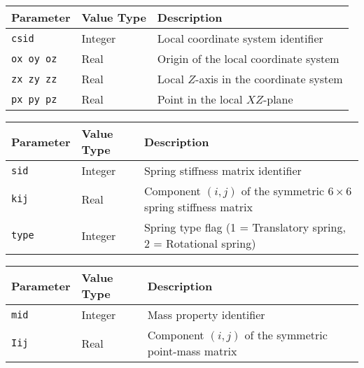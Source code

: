 
\noindent
\begin{tabular}{| m{} | m{} | m{} |}
  \hline
  \rowcolor[HTML]{EFEFEF}
  Parameter  & Value Type & Description \\
  \hline\hline
  {\tt csid} & Integer & Local coordinate system identifier \\
  \hline
  {\tt ox oy oz} & Real & Origin of the local coordinate system \\
  \hline
  {\tt zx zy zz} & Real & Local $Z$-axis in the coordinate system \\
  \hline
  {\tt px py pz} & Real & Point in the local $XZ$-plane \\
  \hline
\end{tabular}


\noindent
  \begin{tabular}{| m{} | m{} | m{} |}
  \hline
  \rowcolor[HTML]{EFEFEF}
  Parameter  & Value Type & Description \\
  \hline\hline
  {\tt sid}  & Integer & Spring stiffness matrix identifier \\
  \hline
  {\tt kij}  & Real & Component $(i,j)$ of the symmetric $6\times6$
               spring stiffness matrix \\
  \hline
  {\tt type} & Integer & Spring type flag \newline
  (1 = Translatory spring, 2 = Rotational spring) \\
  \hline
\end{tabular}


\noindent
\begin{tabular}{| m{} | m{} | m{} |}
  \hline
  \rowcolor[HTML]{EFEFEF}
  Parameter & Value Type & Description \\
  \hline\hline
  {\tt mid} & Integer & Mass property identifier \\
  \hline
  {\tt Iij} & Real & Component $(i,j)$ of the symmetric point-mass matrix \\
  \hline
\end{tabular}

